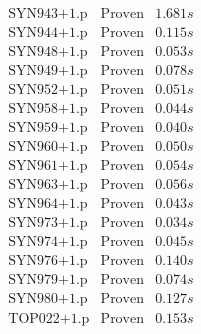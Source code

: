 \documentclass[a4paper,11pt]{report}
\theoremstyle{definition}
\theoremstyle{definition}
\theoremstyle{definition}
\theoremstyle{definition}
\theoremstyle{definition}
\theoremstyle{definition}
\theoremstyle{definition}
\begin{document}
\begin{minipage}{0.45\textwidth}
\[\begin{matrix}
			\text{SYN943+1.p}&\text{Proven}& 1.681 s\\
			\text{SYN944+1.p}&\text{Proven}& 0.115 s\\
			\text{SYN948+1.p}&\text{Proven}& 0.053 s\\
			\text{SYN949+1.p}&\text{Proven}& 0.078 s\\
			\text{SYN952+1.p}&\text{Proven}& 0.051 s\\
			\text{SYN958+1.p}&\text{Proven}& 0.044 s\\
			\text{SYN959+1.p}&\text{Proven}& 0.040 s\\
			\text{SYN960+1.p}&\text{Proven}& 0.050 s\\
			\text{SYN961+1.p}&\text{Proven}& 0.054 s\\
			\text{SYN963+1.p}&\text{Proven}& 0.056 s\\
			\text{SYN964+1.p}&\text{Proven}& 0.043 s\\
			\text{SYN973+1.p}&\text{Proven}& 0.034 s\\
			\text{SYN974+1.p}&\text{Proven}& 0.045 s\\
			\text{SYN976+1.p}&\text{Proven}& 0.140 s\\
			\text{SYN979+1.p}&\text{Proven}& 0.074 s\\
			\text{SYN980+1.p}&\text{Proven}& 0.127 s\\
			\text{TOP022+1.p}&\text{Proven}& 0.153 s\\
		\end{matrix}\]
	\end{minipage}
							
	
	
	
\end{document}
